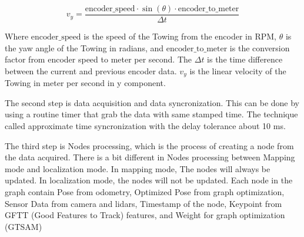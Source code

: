 \documentclass[conference, a4paper]{IEEEtran}[2015/08/26]
\begin{document}
\begin{equation}
	v_y = \frac{\text{encoder\_speed} \cdot \sin(\theta) \cdot \text{encoder\_to\_meter}}{\Delta t}
	\label{eq:vy}
\end{equation}

Where \(\text{encoder\_speed}\) is the speed of the Towing from the encoder in RPM, \(\theta\) is the yaw angle of the Towing in radians, and \(\text{encoder\_to\_meter}\) is the conversion factor from encoder speed to meter per second. The \(\Delta t\) is the time difference between the current and previous encoder data. \(v_y\) is the linear velocity of the Towing in meter per second in y component.

\par    
The second step is data acquisition and data syncronization. This can be done by using a routine timer that grab the data with same stamped time. The technique called approximate time syncronization with the delay tolerance about 10 ms. 

\par    
The third step is Nodes processing, which is the process of creating a node from the data acquired. There is a bit different in Nodes processing between Mapping mode and localization mode. In mapping mode, The nodes will always be updated. In localization mode, the nodes will not be updated. Each node in the graph contain Pose from odometry, Optimized Pose from graph optimization, Sensor Data from camera and lidars, Timestamp of the node, Keypoint from GFTT (Good Features to Track) features, and Weight for graph optimization (GTSAM)
\end{document}
